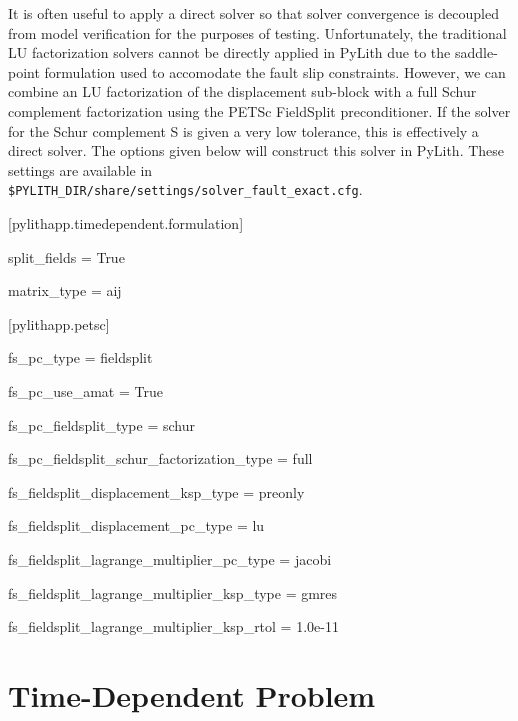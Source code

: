 It is often useful to apply a direct solver so that solver convergence
is decoupled from model verification for the purposes of testing.
Unfortunately, the traditional LU factorization solvers cannot be
directly applied in PyLith due to the saddle-point formulation used
to accomodate the fault slip constraints. However, we can combine
an LU factorization of the displacement sub-block with a full Schur
complement factorization using the PETSc FieldSplit preconditioner.
If the solver for the Schur complement S is given a very low tolerance,
this is effectively a direct solver. The options given below will
construct this solver in PyLith. These settings are available in\texttt{} \\
\texttt{\$PYLITH\_DIR/share/settings/solver\_fault\_exact.cfg}.
\begin{lyxcode}
{[}pylithapp.timedependent.formulation{]}

split\_fields = True

matrix\_type = aij



{[}pylithapp.petsc{]}

fs\_pc\_type = fieldsplit

fs\_pc\_use\_amat = True

fs\_pc\_fieldsplit\_type = schur

fs\_pc\_fieldsplit\_schur\_factorization\_type = full

fs\_fieldsplit\_displacement\_ksp\_type = preonly

fs\_fieldsplit\_displacement\_pc\_type = lu

fs\_fieldsplit\_lagrange\_multiplier\_pc\_type = jacobi

fs\_fieldsplit\_lagrange\_multiplier\_ksp\_type = gmres

fs\_fieldsplit\_lagrange\_multiplier\_ksp\_rtol = 1.0e-11
\end{lyxcode}

\section{Time-Dependent Problem}

